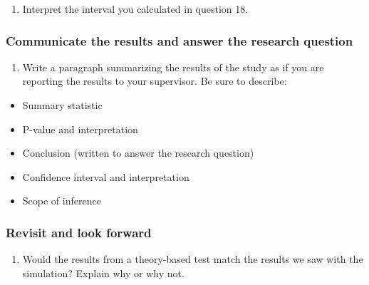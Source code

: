 \documentclass[
]{report}
\providecommand{\tightlist}{%
  \setlength{\itemsep}{0pt}\setlength{\parskip}{0pt}}
\begin{document}
\vspace{0.3in}

\begin{enumerate}
\def\labelenumi{\arabic{enumi}.}
\setcounter{enumi}{18}
\tightlist
\item
  Interpret the interval you calculated in question 18.
\end{enumerate}

\vspace{1in}

\newpage

\hypertarget{communicate-the-results-and-answer-the-research-question-3}{%
\subsubsection*{Communicate the results and answer the research question}\label{communicate-the-results-and-answer-the-research-question-3}}

\begin{enumerate}
\def\labelenumi{\arabic{enumi}.}
\setcounter{enumi}{19}
\tightlist
\item
  Write a paragraph summarizing the results of the study as if you are reporting the results to your supervisor. Be sure to describe:
\end{enumerate}

\begin{itemize}
\item
  Summary statistic
\item
  P-value and interpretation
\item
  Conclusion (written to answer the research question)
\item
  Confidence interval and interpretation
\item
  Scope of inference
\end{itemize}

\vspace{3in}

\hypertarget{revisit-and-look-forward-1}{%
\subsubsection*{Revisit and look forward}\label{revisit-and-look-forward-1}}

\begin{enumerate}
\def\labelenumi{\arabic{enumi}.}
\setcounter{enumi}{20}
\tightlist
\item
  Would the results from a theory-based test match the results we saw with the simulation? Explain why or why not.
\end{enumerate}
\end{document}

